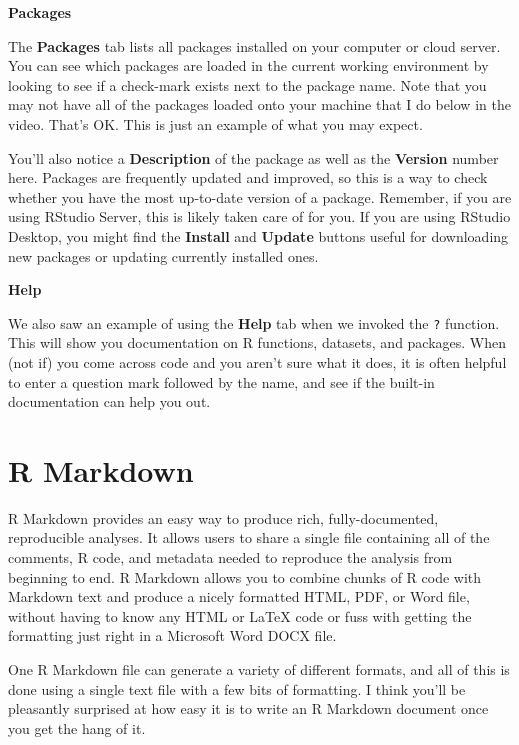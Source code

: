 \documentclass[]{tufte-book}
\begin{document}
\vspace*{0.2in}

\noindent\textbf{Packages}\vspace*{0.1in}

The \textbf{Packages} tab lists all packages installed on your computer or cloud server. You can see which packages are loaded in the current working environment by looking to see if a check-mark exists next to the package name. Note that you may not have all of the packages loaded onto your machine that I do below in the video. That's OK. This is just an example of what you may expect.

You'll also notice a \textbf{Description} of the package as well as the \textbf{Version} number here. Packages are frequently updated and improved, so this is a way to check whether you have the most up-to-date version of a package. Remember, if you are using RStudio Server, this is likely taken care of for you. If you are using RStudio Desktop, you might find the \textbf{Install} and \textbf{Update} buttons useful for downloading new packages or updating currently installed ones.

\vspace*{0.2in}

\noindent\textbf{Help}\vspace*{0.1in}

We also saw an example of using the \textbf{Help} tab when we invoked the \texttt{?} function. This will show you documentation on R functions, datasets, and packages. When (not if) you come across code and you aren't sure what it does, it is often helpful to enter a question mark followed by the name, and see if the built-in documentation can help you out.

\hypertarget{rmarkdown}{%
\chapter{R Markdown}\label{rmarkdown}}

R Markdown provides an easy way to produce rich, fully-documented, reproducible analyses. It allows users to share a single file containing all of the comments, R code, and metadata needed to reproduce the analysis from beginning to end. R Markdown allows you to combine chunks of R code with Markdown text and produce a nicely formatted HTML, PDF, or Word file, without having to know any HTML or LaTeX code or fuss with getting the formatting just right in a Microsoft Word DOCX file.

One R Markdown file can generate a variety of different formats, and all of this is done using a single text file with a few bits of formatting. I think you'll be pleasantly surprised at how easy it is to write an R Markdown document once you get the hang of it.
\end{document}

